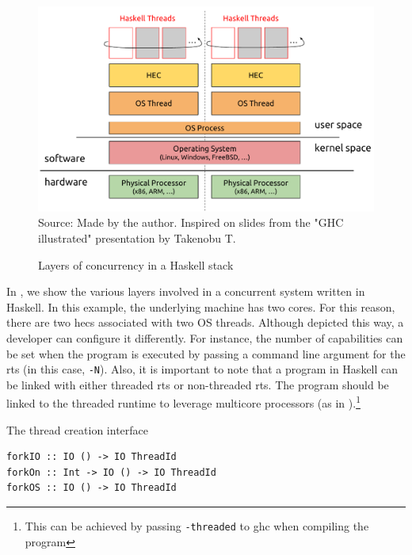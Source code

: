 \begin{figure}[htp]
  \centering
  \caption{Layers of concurrency in a Haskell stack}
  \includegraphics[width=\columnwidth]{images/haskell-concurrency-layers}
  \footnotesize{Source: Made by the author. Inspired on slides from the "GHC illustrated" presentation by Takenobu T.}
  \label{fig:haskell-conc-layers}
\end{figure}

In , we show the various layers involved in a concurrent system written in Haskell. In this example, the underlying machine has two cores. For this reason, there are two \acp{hec} associated with two OS threads. Although depicted this way, a developer can configure it differently. For instance, the number of capabilities can be set when the program is executed  by passing a command line argument for the \ac{rts} (in this case, \texttt{-N}). Also, it is important to note that a program in Haskell can be linked with either threaded \ac{rts} or non-threaded \ac{rts}. The program should be linked to the threaded runtime to leverage multicore processors (as in ).\footnote{This can be achieved by passing \texttt{-threaded} to \ac{ghc} when compiling the program}

\begin{listing}
  \caption{The thread creation interface}
  \begin{verbatim}
forkIO :: IO () -> IO ThreadId
forkOn :: Int -> IO () -> IO ThreadId
forkOS :: IO () -> IO ThreadId
  \end{verbatim}
  \label{code:fork-sig}
\end{listing}

